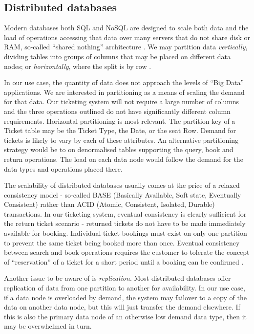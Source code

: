 %
%

\subsection{Distributed databases}
Modern databases both SQL and NoSQL are designed to scale both data and the load of operations accessing that data over many servers that do not share disk or RAM, so-called ``shared nothing'' architecture \cite{RN67}.  We may partition data {\itshape vertically}, dividing tables into groups of columns that may be placed on different data nodes; or {\itshape horizontally}, where the split is by row \cite{RN68}. 

In our use case, the quantity of data does not approach the levels of ``Big Data'' applications.  We are interested in partitioning as a means of scaling the demand for that data.  Our ticketing system will not require a large number of columns and the three operations outlined do not have significantly different column requirements.  Horizontal partitioning is most relevant.  The partition key of a Ticket table may be the Ticket Type, the Date, or the seat Row.  Demand for tickets is likely to vary by each of these attributes.  An alternative partitioning strategy would be to on denormalised tables supporting the query, book and return operations.  The load on each data node would follow the demand for the data types and operations placed there.

The scalability of distributed databases usually comes at the price of a relaxed consistency model - so-called BASE (Basically Available, Soft state, Eventually Consistent) rather than ACID (Atomic, Consistent, Isolated, Durable) transactions.  In our ticketing system, eventual consistency is clearly sufficient for the return ticket scenario - returned tickets do not have to be made immediately available for booking.  Individual ticket bookings must exist on only one partition to prevent the same ticket being booked more than once.  Eventual consistency between search and book operations requires the customer to tolerate the concept of ``reservation'' of a ticket for a short period until a booking can be confirmed \cite{RN1071}\cite{RN67}.

Another issue to be aware of is {\itshape replication}.   Most distributed databases offer replication of data from one partition to another for availability.  In our use case, if a data node is overloaded by demand, the system may failover to a copy of the data on another data node, but this will just transfer the demand elsewhere.  If this is also the primary data node of an otherwise low demand data type, then it may be overwhelmed in turn.

